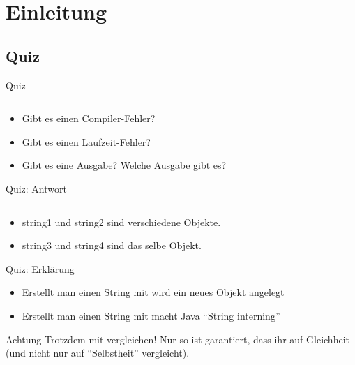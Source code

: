 \documentclass[usepdftitle=false,hyperref={pdfpagelabels=false}]{beamer}
\begin{document}
\title{\titleText}
\subtitle{String interning, Assertions, Einfach verkettete Listen}
\author{\tutor}
\date{3. Dezember 2012}
\subject{Programmieren}

\frame{\titlepage}


\section{Einleitung}
\subsection{Quiz}
\begin{frame}{Quiz}
    \inputminted[linenos=true, numbersep=5pt, tabsize=4, fontsize=\tiny]{java}{QuizString.java}
    \begin{itemize}
        \item Gibt es einen Compiler-Fehler? \xmark
        \item Gibt es einen Laufzeit-Fehler? \xmark
        \item Gibt es eine Ausgabe? \cmark{} Welche Ausgabe gibt es?
    \end{itemize}
\end{frame}

\begin{frame}{Quiz: Antwort}
    \inputminted[linenos=true, numbersep=5pt, tabsize=4, fontsize=\tiny]{java}{QuizString.java}
    \begin{itemize}
        \item string1 und string2 sind verschiedene Objekte.
        \item string3 und string4 sind das selbe Objekt.
    \end{itemize}
\end{frame}

\begin{frame}{Quiz: Erklärung}
    \begin{itemize}[<+->]
        \item Erstellt man einen String mit 
              wird ein neues Objekt angelegt
        \item Erstellt man einen String mit 
              macht Java "`String interning"'
    \end{itemize}
    \pause[\thebeamerpauses]
    \begin{alertblock}{Achtung}
        Trotzdem mit  vergleichen! Nur so
        ist garantiert, dass ihr auf Gleichheit (und nicht nur auf
        "`Selbstheit"' vergleicht).
    \end{alertblock}
\end{frame}
\end{document}
